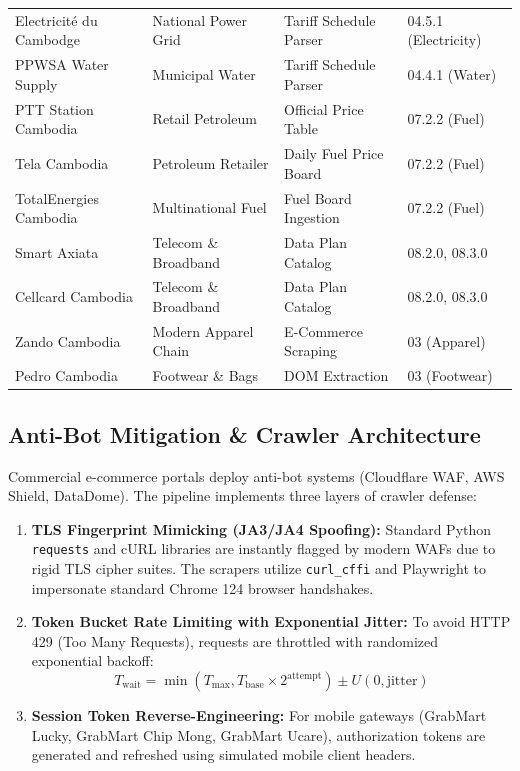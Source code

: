 \documentclass[11pt,a4paper,oneside]{article}
\begin{document}
\begin{longtable}{p{4.2cm}p{3.2cm}p{3.0cm}p{3.8cm}}
Electricité du Cambodge & National Power Grid & Tariff Schedule Parser & 04.5.1 (Electricity) \\
PPWSA Water Supply & Municipal Water & Tariff Schedule Parser & 04.4.1 (Water) \\
PTT Station Cambodia & Retail Petroleum & Official Price Table & 07.2.2 (Fuel) \\
Tela Cambodia & Petroleum Retailer & Daily Fuel Price Board & 07.2.2 (Fuel) \\
TotalEnergies Cambodia & Multinational Fuel & Fuel Board Ingestion & 07.2.2 (Fuel) \\
Smart Axiata & Telecom \& Broadband & Data Plan Catalog & 08.2.0, 08.3.0 \\
Cellcard Cambodia & Telecom \& Broadband & Data Plan Catalog & 08.2.0, 08.3.0 \\
Zando Cambodia & Modern Apparel Chain & E-Commerce Scraping & 03 (Apparel) \\
Pedro Cambodia & Footwear \& Bags & DOM Extraction & 03 (Footwear) \\
\bottomrule
\end{longtable}

\subsection{Anti-Bot Mitigation \& Crawler Architecture}
Commercial e-commerce portals deploy anti-bot systems (Cloudflare WAF, AWS Shield, DataDome). The pipeline implements three layers of crawler defense:
\begin{enumerate}
    \item \textbf{TLS Fingerprint Mimicking (JA3/JA4 Spoofing):} Standard Python \texttt{requests} and cURL libraries are instantly flagged by modern WAFs due to rigid TLS cipher suites. The scrapers utilize \texttt{curl\_cffi} and Playwright to impersonate standard Chrome 124 browser handshakes.
    \item \textbf{Token Bucket Rate Limiting with Exponential Jitter:} To avoid HTTP 429 (Too Many Requests), requests are throttled with randomized exponential backoff:
    \begin{equation}
    T_{\text{wait}} = \min\left(T_{\text{max}}, T_{\text{base}} \times 2^{\text{attempt}}\right) \pm U(0, \text{jitter})
    \end{equation}
    \item \textbf{Session Token Reverse-Engineering:} For mobile gateways (GrabMart Lucky, GrabMart Chip Mong, GrabMart Ucare), authorization tokens are generated and refreshed using simulated mobile client headers.
\end{enumerate}
\end{document}
